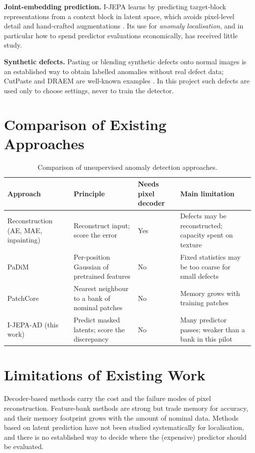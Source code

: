 \documentclass[12pt,a4paper,oneside]{report}
\begin{document}
\textbf{Joint-embedding prediction.} I-JEPA learns by predicting
target-block representations from a context block in latent space, which
avoids pixel-level detail and hand-crafted augmentations
\cite{assran2023ijepa}. Its use for \emph{anomaly localisation}, and in
particular how to spend predictor evaluations economically, has received
little study.

\textbf{Synthetic defects.} Pasting or blending synthetic defects onto
normal images is an established way to obtain labelled anomalies without
real defect data; CutPaste and DRAEM are well-known examples
\cite{li2021cutpaste,zavrtanik2021draem}. In this project such defects are
used only to choose settings, never to train the detector.

\section{Comparison of Existing Approaches}

\begin{table}[H]
\centering
\caption{Comparison of unsupervised anomaly detection approaches.}
\begin{tabular}{p{}p{}p{}p{}}
\toprule
Approach & Principle & Needs pixel decoder & Main limitation\\
\midrule
Reconstruction (AE, MAE, inpainting) & Reconstruct input; score the error & Yes & Defects may be reconstructed; capacity spent on texture\\
PaDiM & Per-position Gaussian of pretrained features & No & Fixed statistics may be too coarse for small defects\\
PatchCore & Nearest neighbour to a bank of nominal patches & No & Memory grows with training patches\\
I-JEPA-AD (this work) & Predict masked latents; score the discrepancy & No & Many predictor passes; weaker than a bank in this pilot\\
\bottomrule
\end{tabular}
\end{table}

\section{Limitations of Existing Work}

Decoder-based methods carry the cost and the failure modes of pixel
reconstruction. Feature-bank methods are strong but trade memory for
accuracy, and their memory footprint grows with the amount of nominal data.
Methods based on latent prediction have not been studied systematically for
localisation, and there is no established way to decide where the
(expensive) predictor should be evaluated.
\end{document}

